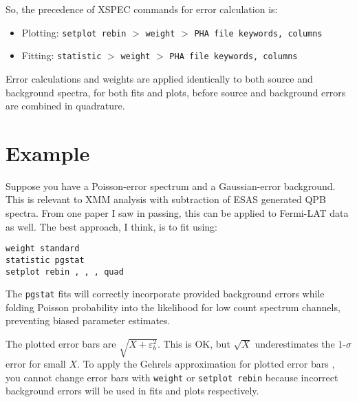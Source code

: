 \documentclass[onecolumn,tighten]{aastex6}
\newcommand*{\code}{\texttt}
\begin{document}
So, the precedence of XSPEC commands for error calculation is:
\begin{itemize}
    \item Plotting: \code{setplot rebin} $>$ \code{weight} $>$ \code{PHA file keywords, columns}
    \item Fitting: \code{statistic} $>$ \code{weight} $>$ \code{PHA file keywords, columns}
\end{itemize}
Error calculations and weights are applied identically to both source and
background spectra, for both fits and plots, before source and background
errors are combined in quadrature.


\section{Example}

Suppose you have a Poisson-error spectrum and a Gaussian-error background.
This is relevant to XMM analysis with subtraction of ESAS generated QPB spectra.
From one paper I saw in passing, this can be applied to Fermi-LAT data as well.
The best approach, I think, is to fit using:
\begin{verbatim}
weight standard
statistic pgstat
setplot rebin , , , quad
\end{verbatim}
The \code{pgstat} fits will correctly incorporate provided background errors
while folding Poisson probability into the likelihood for low count spectrum
channels, preventing biased parameter estimates.

The plotted error bars are $\sqrt{ X + \varepsilon_{b}^2 }$.
This is OK, but $\sqrt{X}$ underestimates the $1$-$\sigma$ error for small $X$.
To apply the Gehrels approximation for plotted error bars \citep{gehrels1986},
you cannot change error bars with \code{weight} or \code{setplot rebin} because
incorrect background errors will be used in fits and plots respectively.
\end{document}
